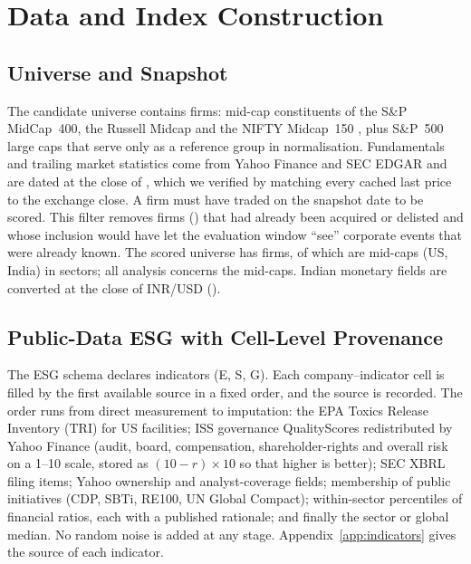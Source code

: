 \section{Data and Index Construction}
\label{sec:data}

\subsection{Universe and Snapshot}
\label{sec:universe}

The candidate universe contains \NRawCompanies firms: mid-cap constituents
of the S\&P MidCap~400, the Russell Midcap and the NIFTY Midcap~150
\cite{nse_midcap150}, plus \NLarge S\&P~500 large caps that serve only as a
reference group in normalisation. Fundamentals and trailing market statistics
come from Yahoo Finance \cite{yahoo_finance, yfinance} and SEC EDGAR
\cite{sec_edgar} and are dated at the close of \SnapshotDate, which we
verified by matching every cached last price to the exchange close. A firm
must have traded on the snapshot date to be scored. This filter removes
\NDroppedNotTrading firms (\DroppedNotTrading) that had already been acquired
or delisted and whose inclusion would have let the evaluation window
``see'' corporate events that were already known. The scored universe has
\NScored firms, of which \NMid are mid-caps (\NUS US, \NIndia India) in
\NSectors sectors; all analysis concerns the mid-caps. Indian monetary fields
are converted at the \SnapshotDate close of INR/USD (\FXRate).

\subsection{Public-Data ESG with Cell-Level Provenance}
\label{sec:esg}

The ESG schema declares \NIndDeclared indicators (\NIndDeclaredE E,
\NIndDeclaredS S, \NIndDeclaredG G). Each company--indicator cell is filled
by the first available source in a fixed order, and the source is recorded.
The order runs from direct measurement to imputation: the EPA Toxics Release
Inventory (TRI) for US facilities; ISS governance QualityScores redistributed
by Yahoo Finance (audit, board, compensation, shareholder-rights and overall
risk on a 1--10 scale, stored as $(10-r)\times 10$ so that higher is
better); SEC XBRL filing items; Yahoo ownership and analyst-coverage fields;
membership of public initiatives (CDP, SBTi, RE100, UN Global Compact);
within-sector percentiles of financial ratios, each with a published
rationale; and finally the sector or global median. No random noise is added
at any stage. Appendix~\ref{app:indicators} gives the source of each
indicator.

